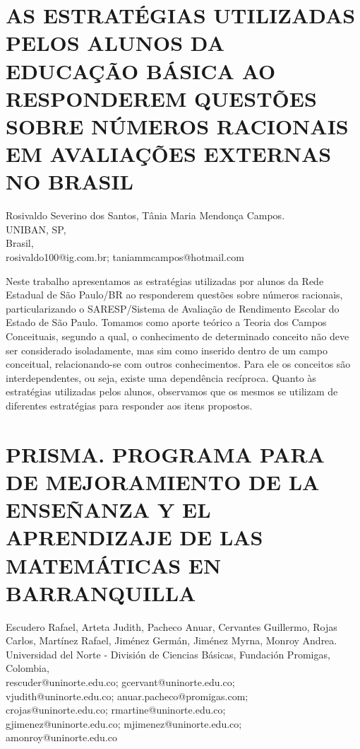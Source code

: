 \section{AS ESTRATÉGIAS UTILIZADAS PELOS ALUNOS DA EDUCAÇÃO BÁSICA AO RESPONDEREM
QUESTÕES SOBRE NÚMEROS RACIONAIS EM AVALIAÇÕES EXTERNAS NO BRASIL}

\begin{datos}
Rosivaldo Severino dos Santos, Tânia Maria Mendonça Campos.\\
UNIBAN, SP,\\
\hfill Brasil, \\
\hfill rosivaldo100@ig.com.br; taniammcampos@hotmail.com
\end{datos}

Neste trabalho apresentamos as estratégias utilizadas por alunos da
Rede Estadual de São Paulo/BR ao responderem questões sobre números
racionais, particularizando o SARESP/Sistema de Avaliação de Rendimento
Escolar do Estado de São Paulo. Tomamos como aporte teórico a Teoria
dos Campos Conceituais, segundo a qual, o conhecimento de determinado
conceito não deve ser considerado isoladamente, mas sim como inserido
dentro de um campo conceitual, relacionando-se com outros conhecimentos.
Para ele os conceitos são interdependentes, ou seja, existe uma dependência
recíproca. Quanto às estratégias utilizadas pelos alunos, observamos
que os mesmos se utilizam de diferentes estratégias para responder
aos itens propostos.


\section{PRISMA. PROGRAMA PARA DE MEJORAMIENTO DE LA ENSEÑANZA Y EL APRENDIZAJE
DE LAS MATEMÁTICAS EN BARRANQUILLA}

\begin{datos}
Escudero Rafael, Arteta Judith, Pacheco Anuar, Cervantes Guillermo, Rojas Carlos, Martínez Rafael, Jiménez Germán, Jiménez Myrna, Monroy Andrea.\\
Universidad del Norte - División de Ciencias Básicas, Fundación Promigas,\\
\hfill Colombia, \\
\hfill rescuder@uninorte.edu.co; gcervant@uninorte.edu.co;
\\ \hfill vjudith@uninorte.edu.co; anuar.pacheco@promigas.com;\\\hfill  crojas@uninorte.edu.co; rmartine@uninorte.edu.co;\\ \hfill gjimenez@uninorte.edu.co; mjimenez@uninorte.edu.co;\\ \hfill amonroy@uninorte.edu.co
\end{datos}

